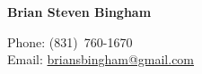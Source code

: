 \documentclass[11pt]{article}
\begin{document}
\begin{minipage}[t]{0.62\textwidth}
  {\LARGE\bfseries Brian Steven Bingham}\\[0.6ex]
\end{minipage}%
\hfill
\begin{minipage}[t]{0.36\textwidth}
  \raggedleft\small
  Phone: (831)~760-1670\\
  Email: \href{mailto:briansbingham@gmail.com}{briansbingham@gmail.com}
\end{minipage}

\vspace{0.5ex}

\nocite{*}





\end{document}

